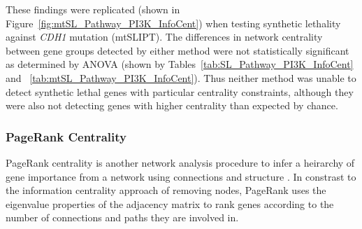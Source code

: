 These findings were replicated (shown in Figure~\ref{fig:mtSL_Pathway_PI3K_InfoCent}) when testing synthetic lethality against \textit{CDH1} mutation (mtSLIPT). The differences in network centrality between gene groups detected by either method were not statistically significant as determined by \gls{ANOVA} (shown by Tables~\ref{tab:SL_Pathway_PI3K_InfoCent} and ~\ref{tab:mtSL_Pathway_PI3K_InfoCent}). Thus neither method was unable to detect synthetic lethal genes with particular centrality constraints, although they were also not detecting genes with higher centrality than expected by chance.


\begin{table*}[!htb]
\caption{ANOVA for Synthetic Lethality and Information Centrality}
\label{tab:SL_Pathway_PI3K_InfoCent}
\noindent{}
\end{table*}

\FloatBarrier

\subsubsection{PageRank Centrality}  \label{chapt4:Network_PageRank}

\FloatBarrier

PageRank centrality is another network analysis procedure to infer a heirarchy of gene importance from a network using connections and structure \citep{Brin1998}. In constrast to the information centrality approach of removing nodes, PageRank uses the eigenvalue properties of the adjacency matrix to rank genes according to the number of connections and paths they are involved in. 

